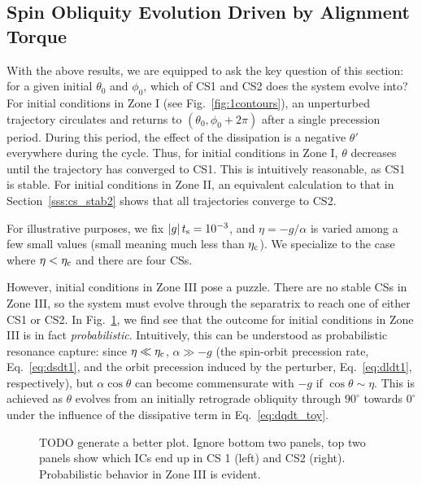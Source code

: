\documentclass[
        fleqn,
        usenatbib,
    ]{mnras}
\newcommand*{\abs}[1]{\left|#1\right|}
\begin{document}
\subsection{Spin Obliquity Evolution Driven by Alignment Torque}

With the above results, we are equipped to ask the key question of this section:
for a given initial $\theta_0$ and $\phi_0$, which of CS1 and CS2 does the
system evolve into? For initial conditions in Zone I (see
Fig.~\ref{fig:1contours}), an unperturbed trajectory circulates and returns to
$(\theta_0, \phi_0 + 2\pi)$ after a single precession period. During this
period, the effect of the dissipation is a negative $\theta'$ everywhere during
the cycle. Thus, for initial conditions in Zone I, $\theta$ decreases until the
trajectory has converged to CS1. This is intuitively reasonable, as CS1 is
stable. For initial conditions in Zone II, an equivalent calculation to that in
Section~\ref{sss:cs_stab2} shows that all trajectories converge to CS2.

For illustrative purposes, we fix $\abs{g}t_{\rm s} = 10^{-3}$, and $\eta =
-g / \alpha$ is varied among a few small values (small
meaning much less than $\eta_{\rm c}$). We specialize to the case where $\eta
< \eta_{\rm c}$ and there are four CSs.

However, initial conditions in Zone III pose a puzzle. There are no stable CSs
in Zone III, so the system must evolve through the separatrix to reach one of
either CS1 or CS2. In Fig.~\ref{fig:toy_phop}, we find see that the outcome for
initial conditions in Zone III is in fact \emph{probabilistic}. Intuitively,
this can be understood as probabilistic resonance capture: since $\eta \ll
\eta_{\rm c}$, $\alpha \gg -g$ (the spin-orbit precession rate,
Eq.~\ref{eq:dsdt1}, and the orbit precession induced by the perturber,
Eq.~\ref{eq:dldt1}, respectively), but $\alpha \cos \theta$ can become
commensurate with $-g$ if $\cos \theta \sim \eta$. This is achieved as $\theta$
evolves from an initially retrograde obliquity through $90^\circ$ towards
$0^\circ$ under the influence of the dissipative term in
Eq.~\eqref{eq:dqdt_toy}.
\begin{figure}
    \centering
    \caption{TODO generate a better plot. Ignore bottom two panels, top two
    panels show which ICs end up in CS 1 (left) and CS2 (right). Probabilistic
    behavior in Zone III is evident.}\label{fig:toy_phop}
\end{figure}
\end{document}
